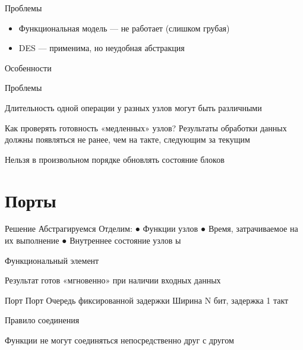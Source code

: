 \documentclass{beamer}
\begin{document}
\begin{frame}{Проблемы}
\begin{itemize}
    \item Функциональная модель — не работает (слишком грубая)
    \item DES — применима, но неудобная абстракция
\end{itemize}



\end{frame}

\begin{frame}{Особенности}


\end{frame}

\begin{frame}{Проблемы}

Длительность одной операции у разных узлов
могут быть различными

 Как проверять готовность «медленных» узлов?
Результаты обработки данных должны появляться
не ранее, чем на такте, следующим за текущим

 Нельзя в произвольном порядке обновлять состояние
блоков

\end{frame}

\section{Порты}

\begin{frame}{Решение}
Абстрагируемся
Отделим:
●
 Функции узлов
●
 Время, затрачиваемое на их выполнение
●
 Внутреннее состояние узлов
ы
\end{frame}


\begin{frame}{Функциональный элемент}

Результат готов «мгновенно» при наличии
входных данных

\end{frame}

\begin{frame}{Порт}
Порт
Очередь фиксированной задержки
Ширина N бит, задержка 1 такт

\end{frame}

\begin{frame}{Правило соединения}

Функции не могут соединяться непосредственно друг с другом


\end{frame}
\end{document}
